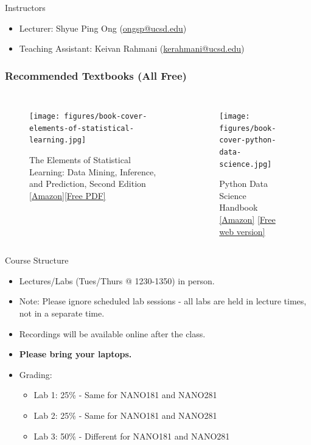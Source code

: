 \documentclass[aspectratio=169]{beamer}
\begin{document}
\begin{frame}{Instructors}
    \begin{itemize}
        \item Lecturer: Shyue Ping Ong (\href{mailto:ongsp@ucsd.edu}{ongsp@ucsd.edu})
        \item Teaching Assistant: Keivan Rahmani (\href{mailto:kerahmani@ucsd.edu}{kerahmani@ucsd.edu})
    \end{itemize}
\end{frame}


\begin{frame}
\frametitle{Recommended Textbooks (All Free)}

\begin{columns}
\begin{figure}
    \centering
    \texttt{[image: figures/book-cover-elements-of-statistical-learning.jpg]}
    \caption{The Elements of Statistical Learning: Data Mining, Inference, and Prediction, Second Edition  \href{http://www.amazon.com/dp/0387848576/ref=cm_sw_em_r_mt_dp_U_LTvbEbPHKK8VF}{[Amazon]}\href{http://web.stanford.edu/~hastie/ElemStatLearn/}{[Free PDF]}}
\end{figure}
\begin{figure}
    \centering
    \texttt{[image: figures/book-cover-python-data-science.jpg]}
    \caption{Python Data Science Handbook
        \href{https://www.amazon.com/dp/1491912057/ref=cm_sw_em_r_mt_dp_U_g0vbEb9N7HVQD}{[Amazon]} \href{http://jakevdp.github.io/PythonDataScienceHandbook/}{[Free web version]}}
\end{figure}
\end{columns}
\end{frame}


\begin{frame}{Course Structure}
    \begin{itemize}
        \item Lectures/Labs (Tues/Thurs @ 1230-1350) in person.
        \item Note: Please ignore scheduled lab sessions - all labs are held in lecture times, not in a separate time.
        \item Recordings will be available online after the class.
        \item \textbf{Please bring your laptops.}
        \item Grading:
        \begin{itemize}
            \item Lab 1: 25\% - Same for NANO181 and NANO281
            \item Lab 2: 25\% - Same for NANO181 and NANO281
            \item Lab 3: 50\% - Different for NANO181 and NANO281
        \end{itemize}
    \end{itemize}
\end{frame}
\end{document}
